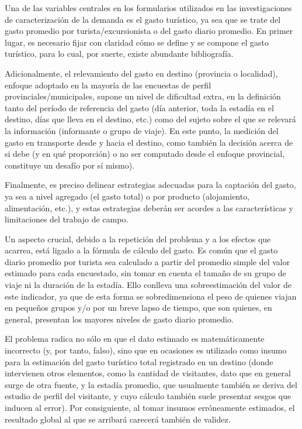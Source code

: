 \documentclass[
]{book}
\begin{document}
Una de las variables centrales en los formularios utilizados en las investigaciones de caracterización de la demanda es el gasto turístico, ya sea que se trate del gasto promedio por turista/excursionista o del gasto diario promedio. En primer lugar, es necesario fijar con claridad cómo se define y se compone el gasto turístico, para lo cual, por suerte, existe abundante bibliografía.

Adicionalmente, el relevamiento del gasto en destino (provincia o localidad), enfoque adoptado en la mayoría de las encuestas de perfil provinciales/municipales, supone un nivel de dificultad extra, en la definición tanto del período de referencia del gasto (día anterior, toda la estadía en el destino, días que lleva en el destino, etc.) como del sujeto sobre el que se relevará la información (informante o grupo de viaje). En este punto, la medición del gasto en transporte desde y hacia el destino, como también la decisión acerca de si debe (y en qué proporción) o no ser computado desde el enfoque provincial, constituye un desafío por sí mismo).

Finalmente, es preciso delinear estrategias adecuadas para la captación del gasto, ya sea a nivel agregado (el gasto total) o por producto (alojamiento, alimentación, etc.), y estas estrategias deberán ser acordes a las características y limitaciones del trabajo de campo.

Un aspecto crucial, debido a la repetición del problema y a los efectos que acarrea, está ligado a la fórmula de cálculo del gasto. Es común que el gasto diario promedio por turista sea calculado a partir del promedio simple del valor estimado para cada encuestado, sin tomar en cuenta el tamaño de su grupo de viaje ni la duración de la estadía. Ello conlleva una sobreestimación del valor de este indicador, ya que de esta forma se sobredimensiona el peso de quienes viajan en pequeños grupos y/o por un breve lapso de tiempo, que son quienes, en general, presentan los mayores niveles de gasto diario promedio.

El problema radica no sólo en que el dato estimado es matemáticamente incorrecto (y, por tanto, falso), sino que en ocasiones es utilizado como insumo para la estimación del gasto turístico total registrado en un destino (donde intervienen otros elementos, como la cantidad de visitantes, dato que en general surge de otra fuente, y la estadía promedio, que usualmente también se deriva del estudio de perfil del visitante, y cuyo cálculo también suele presentar sesgos que inducen al error). Por consiguiente, al tomar insumos erróneamente estimados, el resultado global al que se arribará carecerá también de validez.
\end{document}
